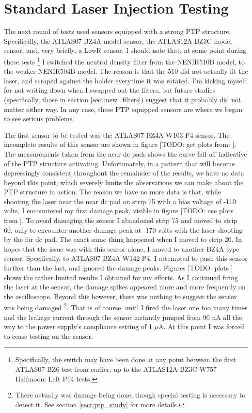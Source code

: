 \documentclass{report}
\begin{document}
        \section{Standard Laser Injection Testing}
            The next round of tests used sensors equipped with a strong PTP structure. Specifically, the ATLAS07 BZ4A model sensor, the ATLAS12A BZ3C model sensor, and, very briefly, a LowR sensor. I should note that, at some point during these tests \footnote{Specifically, the switch may have been done at any point between the first ATLAS07 BZ6 test from earlier, up to the ATLAS12A BZ3C W757 Halfmoon: Left P14 tests.} I switched the neutral density filter from the NENIR510B model, to the weaker NENIR504B model. The reason is that the 510 did not actually fit the laser, and scraped against the holder everytime it was rotated. I'm kicking myself for not writing down when I swapped out the filters, but future studies (specifically, those in section \ref{sect:new_filters}) suggest that it probably did not matter either way. In any case, these PTP equipped sensors are where we began to see serious problems.
            
            The first sensor to be tested was the ATLAS07 BZ4A W103-P4 sensor. The incomplete results of this sensor are shown in figure [TODO: get plots from:
            ]. The measurements taken from the near dc pads shows the curve fall-off indicative of the PTP structure activating. Unfortunately, in a pattern that will become depressingly consistent throughout the remainder of the results, we have no data beyond this point, which severely limits the observations we can make about the PTP structure in action. The reason we have no more data is that, while shooting the laser near the near dc pad on strip 75 with a bias voltage of -110 volts, I encountered my first damage peak, visible in figure [TODO: use plots from
            ]. To avoid damaging the sensor I abandoned strip 75 and moved to strip 60, only to encounter another damage peak at -170 volts with the laser shooting by the far dc pad. The exact same thing happened when I moved to strip 20. In hopes that the issue was with this sensor alone, I moved to another BZ4A type sensor. Specifically, to ATLAS07 BZ4A W142-P4. I attempted to push this sensor further than the last, and ignored the damage peaks. Figures [TODO: plots
            ] shows the rather limited results I obtained for my efforts. As I continued firing the laser at the sensor, the damage spikes appeared more and more frequently on the oscilloscope. Beyond this however, there was nothing to suggest the sensor was being damaged \footnote{There actually was damage being done, though special testing is necessary to detect it. See section \ref{sect:ptp_study} for more details.}. That is of course, until I fired the laser one too many times and the leakage current through the sensor instantly jumped from 90 nA all the way to the power supply's compliance setting of 1 $\mu$A. At this point I was forced to cease testing on the sensor.
\end{document}
